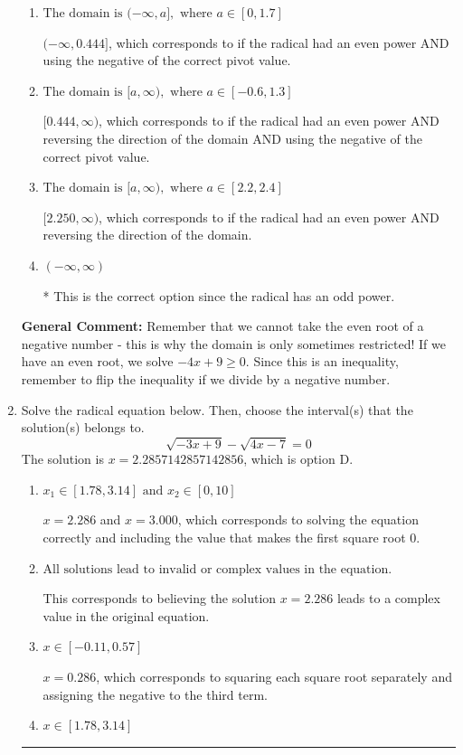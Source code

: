 \documentclass{extbook}[14pt]
\newcommand{\litem}[1]{\item #1

\rule{\textwidth}{0.4pt}}
\begin{document}
\begin{enumerate}
{\begin{enumerate}[label=\Alph*.]
$(-\infty, 2.250]$, which corresponds to if the radical had an even power.
\item \( \text{The domain is } (-\infty, a], \text{   where } a \in [0, 1.7] \)

$(-\infty, 0.444]$, which corresponds to if the radical had an even power AND using the negative of the correct pivot value.
\item \( \text{The domain is } [a, \infty), \text{   where } a \in [-0.6, 1.3] \)

$[0.444, \infty)$, which corresponds to if the radical had an even power AND reversing the direction of the domain AND using the negative of the correct pivot value.
\item \( \text{The domain is } [a, \infty), \text{   where } a \in [2.2, 2.4] \)

$[2.250, \infty)$, which corresponds to if the radical had an even power AND reversing the direction of the domain.
\item \( (-\infty, \infty) \)

* This is the correct option since the radical has an odd power.
\end{enumerate}

\textbf{General Comment:} Remember that we cannot take the even root of a negative number - this is why the domain is only sometimes restricted! If we have an even root, we solve $-4 x + 9 \geq 0$. Since this is an inequality, remember to flip the inequality if we divide by a negative number.
}
\litem{
Solve the radical equation below. Then, choose the interval(s) that the solution(s) belongs to.
\[ \sqrt{-3 x + 9} - \sqrt{4 x - 7} = 0 \]The solution is \( x = 2.2857142857142856 \), which is option D.\begin{enumerate}[label=\Alph*.]
\item \( x_1 \in [1.78, 3.14] \text{ and } x_2 \in [0,10] \)

$x = 2.286$ and $x = 3.000$, which corresponds to solving the equation correctly and including the value that makes the first square root 0.
\item \( \text{All solutions lead to invalid or complex values in the equation.} \)

This corresponds to believing the solution $x = 2.286$ leads to a complex value in the original equation.
\item \( x \in [-0.11,0.57] \)

$x = 0.286$, which corresponds to squaring each square root separately and assigning the negative to the third term.
\item \( x \in [1.78,3.14] \)


\end{enumerate}}
\end{enumerate}
\end{document}
